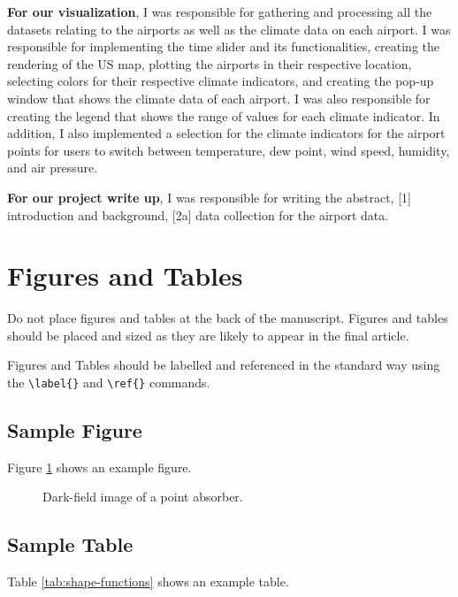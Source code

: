 \documentclass[9pt,twocolumn,twoside]{opticajnl}
\begin{document}
\textbf{For our visualization}, I was responsible for gathering and processing all the datasets relating to the airports as well as the climate data on each airport. I was responsible for implementing the time slider and its functionalities, creating the rendering of the US map, plotting the airports in their respective location, selecting colors for their respective climate indicators, and creating the pop-up window that shows the climate data of each airport. I was also responsible for creating the legend that shows the range of values for each climate indicator. In addition, I also implemented a selection for the climate indicators for the airport points for users to switch between temperature, dew point, wind speed, humidity, and air pressure.

\textbf{For our project write up}, I was responsible for writing the abstract, [1] introduction and background, [2a] data collection for the airport data.



\section{Figures and Tables}

Do not place figures and tables at the back of the manuscript. Figures and tables should be placed and sized as they are likely to appear in the final article. 

Figures and Tables should be labelled and referenced in the standard way using the \verb|\label{}| and \verb|\ref{}| commands.

\subsection{Sample Figure}

Figure \ref{fig:false-color} shows an example figure.

\begin{figure}[ht]
\centering
\caption{Dark-field image of a point absorber.}
\label{fig:false-color}
\end{figure}

\subsection{Sample Table}

Table \ref{tab:shape-functions} shows an example table.
\end{document}
